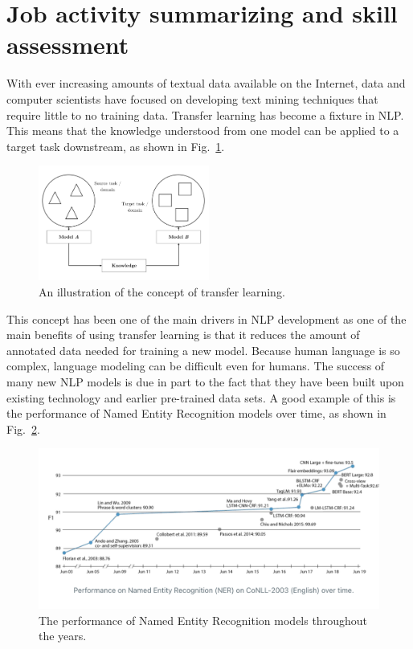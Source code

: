 \section{Job activity summarizing and skill assessment}
\label{sec:activites}

With ever increasing amounts of textual data available on the Internet, data and computer scientists have focused on developing text mining techniques that require little to no training data. Transfer learning has become a fixture in NLP. This means that the knowledge understood from one model can be applied to a target task downstream, as shown in Fig.~\ref{fig:transferlearning}.

\begin{figure}[htbp]
  \centering
    \includegraphics[width=0.5\textwidth]{figures/transferlearning.pdf}
    \caption{
    An illustration of the concept of transfer learning. 
    }
\label{fig:transferlearning}
\end{figure}


This concept has been one of the main drivers in NLP development as one of the main benefits of using transfer learning is that it reduces the amount of annotated data needed for training a new model. Because human language is so complex, language modeling can be difficult even for humans. The success of many new NLP models is due in part to the fact that they have been built upon existing technology and earlier pre-trained data sets. A good example of this is the performance of Named Entity Recognition models over time, as shown in Fig.~\ref{fig:NERPerformance}.

\begin{figure}[htbp]
  \centering
    \includegraphics[width=1.0\textwidth]{figures/NERPerformance.pdf}
    \caption{
    The performance of Named Entity Recognition models throughout the years. 
    }
\label{fig:NERPerformance}
\end{figure}



